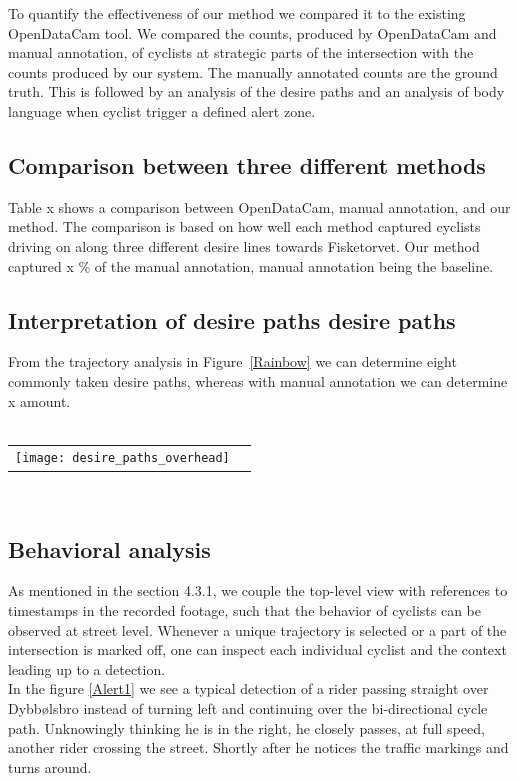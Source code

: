 To quantify the effectiveness of our method we compared it to the existing OpenDataCam tool.
We compared the counts, produced by OpenDataCam and manual annotation, of cyclists at strategic parts of the 
intersection with the counts produced by our system. The manually annotated counts are the ground truth.
This is followed by an analysis of the desire paths and an analysis of body language when cyclist trigger a defined
alert zone.
\ \\ 

\subsection{Comparison between three different methods}
Table x shows a comparison between OpenDataCam, manual annotation, and our method.
The comparison is based on how well each method captured cyclists driving on along three different 
desire lines towards Fisketorvet.
Our method captured x \% of the manual annotation, manual annotation being the baseline.
\ \\

\subsection{Interpretation of desire paths desire paths}
From the trajectory analysis in Figure~\ref{Rainbow} we can determine eight commonly taken desire paths,  
whereas with manual annotation we can determine x amount.
\ \\
\raggedbottom
\ \\ 
\noindent
\begin{tabular}{@{}cc}
\texttt{[image: desire\_paths\_overhead]} 
\end{tabular}
\label{traject}

\ \\
\subsection{Behavioral analysis}
As mentioned in the section 4.3.1, we couple the top-level view with references to timestamps in the recorded footage, 
such that the behavior of cyclists can be observed at street level.
Whenever a unique trajectory is selected or a part of the intersection is marked off, one can inspect each individual cyclist 
and the context leading up to a detection.
\\

In the figure \ref{Alert1} we see a typical detection of a rider passing straight over Dybbølsbro instead of turning left and 
continuing over the bi-directional cycle path. Unknowingly thinking he is in the right, he closely passes, at full speed, another rider crossing
the street. Shortly after he notices the traffic markings and turns around. 

